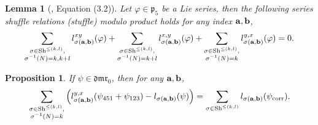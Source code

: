 \documentclass[a4paper,fleqn]{cas-sc}
\newtheorem{lemma}[theorem]{Lemma}
\newtheorem{proposition}[theorem]{Proposition}
\begin{document}
\begin{lemma}[\cite{Furusho2011}, Equation (3.2)] Let $\varphi\in \mathfrak{p}_5$ be a Lie series, then the following \emph{series shuffle relations (stuffle)} modulo product holds for any index $\bf{a},\bf{b}$,
	\begin{equation}\label{eq:stuffle 2 variable}
		\sum_{\substack{\sigma\in \text{Sh}^{\le(k,l)}, \\
        \sigma^{-1}(N)=k,k+l}} l^{xy}_{\sigma(\bf{a},\bf{b})}(\varphi) 
        +\sum_{\substack{\sigma\in \text{Sh}^{\le(k,l)}, \\ \sigma^{-1}(N)=k+l}} l^{x,y}_{\sigma(\bf{a},\bf{b})}(\varphi) 
        +\sum_{\substack{\sigma\in \text{Sh}^{\le(k,l)}, \\ \sigma^{-1}(N)=k}} l^{y,x}_{\sigma(\bf{a},\bf{b})}(\varphi)=0.
	\end{equation}

\end{lemma}

\begin{proposition} \label{prop:sum}
	If $\psi \in \mathfrak{dmr}_0$, then for any $\bf{a,b}$,
	\begin{equation}\label{eq:sum}
		\sum_{\substack{\sigma\in \text{Sh}^{\le(k,l)}, \\ \sigma^{-1}(N)=k}} \left( l^{y,x}_{\sigma(\bf{a},\bf{b})}(\psi_{451}+\psi_{123})-l_{\sigma(\bf{a},\bf{b})}(\psi)\right)=\sum_{\sigma\in \text{Sh}^{\le(k,l)}}l_{\sigma(\bf{a},\bf{b})}(\psi_{\text{corr}}).
	\end{equation}
\end{proposition}
\end{document}
